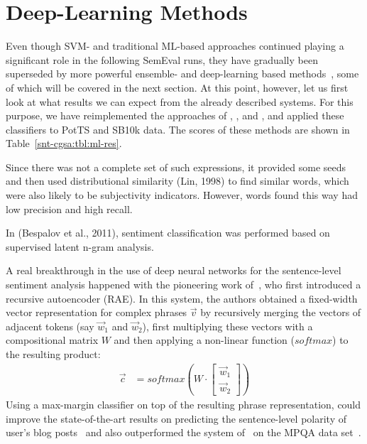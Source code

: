 \section{Deep-Learning Methods}\label{sec:cgsa:dl-based}

Even though SVM- and traditional ML-based approaches continued playing
a significant role in the following SemEval runs, they have gradually
been superseded by more powerful ensemble- and deep-learning based
methods~\cite[e.g., ][]{Hagen:15,Deriu:16,Xu:16}, some of which will
be covered in the next section.  At this point, however, let us first
look at what results we can expect from the already described systems.
For this purpose, we have reimplemented the approaches of
\citet{Gamon:04}, \citet{Mohammad:13}, and \citet{Guenther:14}, and
applied these classifiers to PotTS and SB10k data.  The scores of
these methods are shown in Table~\ref{snt-cgsa:tbl:ml-res}.


Since there was not a complete set of such expressions, it provided
some seeds and then used distributional similarity (Lin, 1998) to find
similar words, which were also likely to be subjectivity
indicators. However, words found this way had low precision and high
recall.


In (Bespalov et al., 2011), sentiment classification was performed
based on supervised latent n-gram analysis.


\citet{Yessenalina:11}

A real breakthrough in the use of deep neural networks for the
sentence-level sentiment analysis happened with the pioneering work
of~\citet{Socher:11}, who first introduced a recursive autoencoder
(RAE).  In this system, the authors obtained a fixed-width vector
representation for complex phrases $\vec{v}$ by recursively merging
the vectors of adjacent tokens (say $\vec{w}_1$ and $\vec{w}_2$),
first multiplying these vectors with a compositional matrix $W$ and
then applying a non-linear function ($softmax$) to the resulting
product:
\begin{align*}
  \vec{c} &= softmax\left(W\cdot\begin{bmatrix}
  \vec{w}_1\\
  \vec{w}_2
  \end{bmatrix}\right)
\end{align*}
Using a max-margin classifier on top of the resulting phrase
representation, \citet{Socher:11} could improve the state-of-the-art
results on predicting the sentence-level polarity of user's blog
posts~\cite{Potts:10} and also outperformed the system
of~\citet{Nasukawa:03} on the MPQA data set~\cite{Wiebe:05}.

